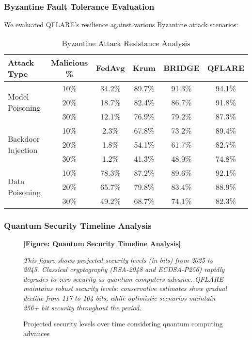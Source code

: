 \documentclass[journal,onecolumn]{IEEEtran}
\begin{document}
\subsubsection{Byzantine Fault Tolerance Evaluation}

We evaluated QFLARE's resilience against various Byzantine attack scenarios:

\begin{table}[htbp]
\centering
\caption{Byzantine Attack Resistance Analysis}
\begin{tabular}{|l|c|c|c|c|c|}
\hline
\textbf{Attack Type} & \textbf{Malicious \%} & \textbf{FedAvg} & \textbf{Krum} & \textbf{BRIDGE} & \textbf{QFLARE} \\
\hline
\multirow{3}{*}{Model Poisoning} & 10\% & 34.2\% & 89.7\% & 91.3\% & 94.1\% \\
& 20\% & 18.7\% & 82.4\% & 86.7\% & 91.8\% \\
& 30\% & 12.1\% & 76.9\% & 79.2\% & 87.3\% \\
\hline
\multirow{3}{*}{Backdoor Injection} & 10\% & 2.3\% & 67.8\% & 73.2\% & 89.4\% \\
& 20\% & 1.8\% & 54.1\% & 61.7\% & 82.7\% \\
& 30\% & 1.2\% & 41.3\% & 48.9\% & 74.8\% \\
\hline
\multirow{3}{*}{Data Poisoning} & 10\% & 78.3\% & 87.2\% & 89.6\% & 92.1\% \\
& 20\% & 65.7\% & 79.8\% & 83.4\% & 88.9\% \\
& 30\% & 49.2\% & 68.7\% & 74.1\% & 82.3\% \\
\hline
\end{tabular}
\end{table}

\subsubsection{Quantum Security Timeline Analysis}

\begin{figure}[htbp]
\centering
\textbf{[Figure: Quantum Security Timeline Analysis]}

\textit{This figure shows projected security levels (in bits) from 2025 to 2045. Classical cryptography (RSA-2048 and ECDSA-P256) rapidly degrades to zero security as quantum computers advance. QFLARE maintains robust security levels: conservative estimates show gradual decline from 117 to 104 bits, while optimistic scenarios maintain 256+ bit security throughout the period.}
\caption{Projected security levels over time considering quantum computing advances}
\end{figure}
\end{document}
